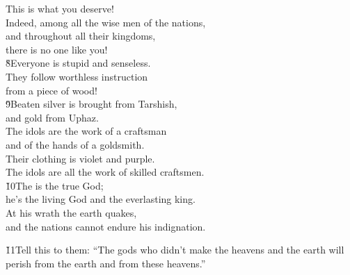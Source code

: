 \begin{poetry}
\poemll    This is what you deserve! \\
\poeml Indeed, among all the wise men of the nations, \\
\poemll    and throughout all their kingdoms, \\
\poemlll       there is no one like you! \\
\poeml \v{8}Everyone is stupid and senseless. \\
\poemll    They follow worthless instruction \\
\poemlll       from a piece of wood! \\
\poeml \v{9}Beaten silver is brought from Tarshish, \\
\poemll    and gold from Uphaz. \\
\poeml The idols are the work of a craftsman \\
\poemll    and of the hands of a goldsmith. \\
\poeml Their clothing is violet and purple. \\
\poemll    The idols are all the work of skilled craftsmen. \\
\poeml \v{10}The  is the true God; \\
\poemll    he's the living God and the everlasting king. \\
\poeml At his wrath the earth quakes, \\
\poemll    and the nations cannot endure his indignation.
\end{poetry}

\v{11}Tell this to them: ``The gods who didn't make the heavens and the earth will perish from the earth and from these heavens.''

